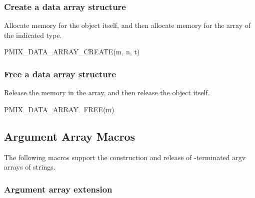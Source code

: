\subsubsection{Create a data array structure}

Allocate memory for the  object itself, and then allocate memory for the array of the indicated type.

\cspecificstart
\begin{codepar}
PMIX_DATA_ARRAY_CREATE(m, n, t)
\end{codepar}
\cspecificend

\begin{arglist}
\end{arglist}


\subsubsection{Free a data array structure}

Release the memory in the array, and then release the  object itself.

\cspecificstart
\begin{codepar}
PMIX_DATA_ARRAY_FREE(m)
\end{codepar}
\cspecificend

\begin{arglist}
\end{arglist}

\subsection{Argument Array Macros}

The following macros support the construction and release of -terminated argv arrays of strings.

\subsubsection{Argument array extension}


